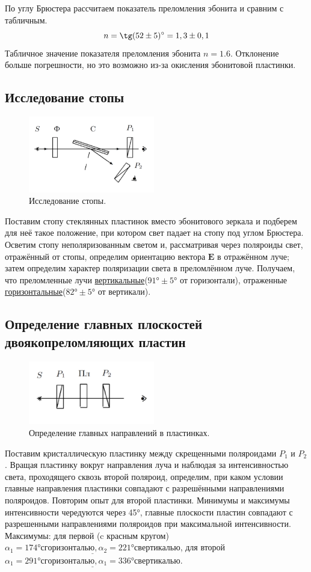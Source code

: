 \documentclass[11pt]{article}
\begin{document}
По углу Брюстера рассчитаем показатель преломления эбонита и сравним с табличным.
\begin{equation}\label{eq:1}
    n = \tg (52 \pm 5)^{\circ} = 1,3 \pm 0,1
\end{equation}
Табличное значение показателя преломления эбонита $ n = 1.6 $. Отклонение больше погрешности, но это возможно из-за окисления эбонитовой пластинки.

\subsection{Исследование стопы}
\begin{figure}
    \includegraphics[width=5.5cm]{Screenshot_2.png}
    \caption{Исследование стопы.}
    \label{pic:2}
\end{figure}
Поставим стопу стеклянных пластинок вместо эбонитового зеркала и подберем для неё такое положение, при котором свет падает на стопу под углом Брюстера. Осветим стопу неполяризованным светом и, рассматривая через поляроиды свет, отражённый от стопы, определим ориентацию вектора $ \mathbf{E} $ в отражённом луче; затем определим характер поляризации света в преломлённом луче. Получаем, что преломленные лучи \underline{вертикальные}($91° \pm 5°$ от горизонтали), отраженные \underline{горизонтальные}($82° \pm 5°$ от вертикали).

\subsection{Определение главных плоскостей двоякопреломляющих пластин}
\begin{figure}
    \includegraphics[width=5.5cm]{Screenshot_3.png}
    \caption{Определение главных направлений в пластинках.}
    \label{pic:3}
\end{figure}
Поставим кристаллическую пластинку между скрещенными поляроидами $ P_1 $ и $ P_2 $. Вращая пластинку вокруг направления луча и наблюдая за интенсивностью света, проходящего сквозь второй поляроид, определим, при каком условии главные направления пластинки совпадают с разрешёнными направлениями поляроидов. Повторим опыт для второй пластинки. Минимумы и максимумы интенсивности чередуются через 45°, главные плоскости пластин совпадают с разрешенными направлениями поляроидов при максимальной интенсивности. Максимумы: для первой (c красным кругом) $ \underline{\alpha_1 = 174 ° с горизонталью, \alpha_2 = 221 ° с вертикалью}$, для второй $\underline{ \alpha_1 = 291 ° с горизонталью, \alpha_1 = 336 ° с вертикалью}$.
\end{document}
